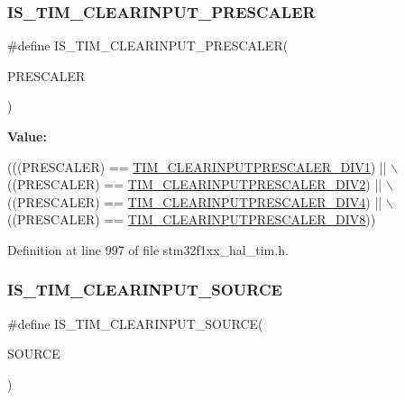 \subsubsection{\texorpdfstring{I\+S\+\_\+\+T\+I\+M\+\_\+\+C\+L\+E\+A\+R\+I\+N\+P\+U\+T\+\_\+\+P\+R\+E\+S\+C\+A\+L\+ER}{IS\_TIM\_CLEARINPUT\_PRESCALER}}
{\footnotesize\ttfamily \#define I\+S\+\_\+\+T\+I\+M\+\_\+\+C\+L\+E\+A\+R\+I\+N\+P\+U\+T\+\_\+\+P\+R\+E\+S\+C\+A\+L\+ER(\begin{DoxyParamCaption}\item[{}]{P\+R\+E\+S\+C\+A\+L\+ER }\end{DoxyParamCaption})}

{\bfseries Value\+:}
\begin{DoxyCode}
(((PRESCALER) == \hyperlink{group___t_i_m___clear_input___prescaler_gaf88d719dd5535b6b58275549c4512ec7}{TIM\_CLEARINPUTPRESCALER\_DIV1}) || \(\backslash\)
                                                  ((PRESCALER) == 
      \hyperlink{group___t_i_m___clear_input___prescaler_gae54b2f4ea04ef97f7c75755347edc8ba}{TIM\_CLEARINPUTPRESCALER\_DIV2}) || \(\backslash\)
                                                  ((PRESCALER) == 
      \hyperlink{group___t_i_m___clear_input___prescaler_gae3c3dea810bb9d83b532737f01a3213d}{TIM\_CLEARINPUTPRESCALER\_DIV4}) || \(\backslash\)
                                                  ((PRESCALER) == 
      \hyperlink{group___t_i_m___clear_input___prescaler_ga34bc6cb7ee8800cc48b1ee6c536859cc}{TIM\_CLEARINPUTPRESCALER\_DIV8}))
\end{DoxyCode}


Definition at line 997 of file stm32f1xx\+\_\+hal\+\_\+tim.\+h.

\mbox{\label{group___t_i_m___private___macros_ga74df4c66e37601fa4ffad371b071dd8d}} 
\subsubsection{\texorpdfstring{I\+S\+\_\+\+T\+I\+M\+\_\+\+C\+L\+E\+A\+R\+I\+N\+P\+U\+T\+\_\+\+S\+O\+U\+R\+CE}{IS\_TIM\_CLEARINPUT\_SOURCE}}
{\footnotesize\ttfamily \#define I\+S\+\_\+\+T\+I\+M\+\_\+\+C\+L\+E\+A\+R\+I\+N\+P\+U\+T\+\_\+\+S\+O\+U\+R\+CE(\begin{DoxyParamCaption}\item[{}]{S\+O\+U\+R\+CE }\end{DoxyParamCaption})}

